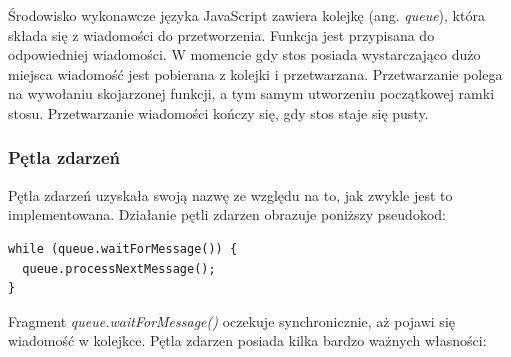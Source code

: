 \documentclass[polish, twoside, 12pt]{mwart}
\begin{document}
Środowisko wykonawcze języka JavaScript zawiera kolejkę (ang. \emph{queue}), która składa się z wiadomości do przetworzenia. Funkcja jest przypisana do odpowiedniej wiadomości. W momencie gdy stos posiada wystarczająco dużo miejsca wiadomość jest pobierana z kolejki i przetwarzana. Przetwarzanie polega na wywołaniu skojarzonej funkcji, a tym samym utworzeniu początkowej ramki stosu.
Przetwarzanie wiadomości kończy się, gdy stos staje się pusty.

\subsubsection{Pętla zdarzeń}

Pętla zdarzeń uzyskała swoją nazwę ze względu na to, jak zwykle jest to implementowana. Działanie pętli zdarzen obrazuje poniższy pseudokod:

\begin{lstlisting}
while (queue.waitForMessage()) {
  queue.processNextMessage();
}
\end{lstlisting}

Fragment \emph{queue.waitForMessage()} oczekuje synchronicznie, aż pojawi się wiadomość w kolejkce. Pętla zdarzen posiada kilka bardzo ważnych własności:
\end{document}
